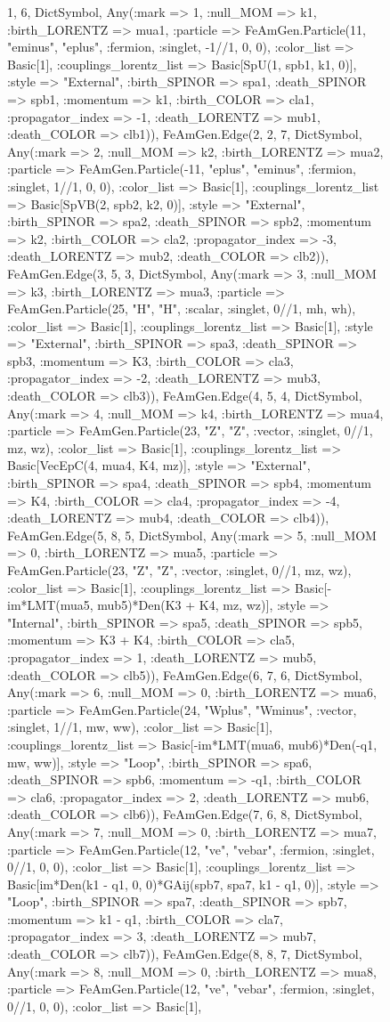 \documentclass{revtex4}
\begin{document}
\begin{figure}[!htb]
\begin{center}
{1, 6, Dict{Symbol, Any}(:mark => 1, :null_MOM => k1, :birth_LORENTZ => mua1, :particle => FeAmGen.Particle(11, "eminus", "eplus", :fermion, :singlet, -1//1, 0, 0), :color_list => Basic[1], :couplings_lorentz_list => Basic[SpU(1, spb1, k1, 0)], :style => "External", :birth_SPINOR => spa1, :death_SPINOR => spb1, :momentum => k1, :birth_COLOR => cla1, :propagator_index => -1, :death_LORENTZ => mub1, :death_COLOR => clb1)), FeAmGen.Edge(2, 2, 7, Dict{Symbol, Any}(:mark => 2, :null_MOM => k2, :birth_LORENTZ => mua2, :particle => FeAmGen.Particle(-11, "eplus", "eminus", :fermion, :singlet, 1//1, 0, 0), :color_list => Basic[1], :couplings_lorentz_list => Basic[SpVB(2, spb2, k2, 0)], :style => "External", :birth_SPINOR => spa2, :death_SPINOR => spb2, :momentum => k2, :birth_COLOR => cla2, :propagator_index => -3, :death_LORENTZ => mub2, :death_COLOR => clb2)), FeAmGen.Edge(3, 5, 3, Dict{Symbol, Any}(:mark => 3, :null_MOM => k3, :birth_LORENTZ => mua3, :particle => FeAmGen.Particle(25, "H", "H", :scalar, :singlet, 0//1, mh, wh), :color_list => Basic[1], :couplings_lorentz_list => Basic[1], :style => "External", :birth_SPINOR => spa3, :death_SPINOR => spb3, :momentum => K3, :birth_COLOR => cla3, :propagator_index => -2, :death_LORENTZ => mub3, :death_COLOR => clb3)), FeAmGen.Edge(4, 5, 4, Dict{Symbol, Any}(:mark => 4, :null_MOM => k4, :birth_LORENTZ => mua4, :particle => FeAmGen.Particle(23, "Z", "Z", :vector, :singlet, 0//1, mz, wz), :color_list => Basic[1], :couplings_lorentz_list => Basic[VecEpC(4, mua4, K4, mz)], :style => "External", :birth_SPINOR => spa4, :death_SPINOR => spb4, :momentum => K4, :birth_COLOR => cla4, :propagator_index => -4, :death_LORENTZ => mub4, :death_COLOR => clb4)), FeAmGen.Edge(5, 8, 5, Dict{Symbol, Any}(:mark => 5, :null_MOM => 0, :birth_LORENTZ => mua5, :particle => FeAmGen.Particle(23, "Z", "Z", :vector, :singlet, 0//1, mz, wz), :color_list => Basic[1], :couplings_lorentz_list => Basic[-im*LMT(mua5, mub5)*Den(K3 + K4, mz, wz)], :style => "Internal", :birth_SPINOR => spa5, :death_SPINOR => spb5, :momentum => K3 + K4, :birth_COLOR => cla5, :propagator_index => 1, :death_LORENTZ => mub5, :death_COLOR => clb5)), FeAmGen.Edge(6, 7, 6, Dict{Symbol, Any}(:mark => 6, :null_MOM => 0, :birth_LORENTZ => mua6, :particle => FeAmGen.Particle(24, "Wplus", "Wminus", :vector, :singlet, 1//1, mw, ww), :color_list => Basic[1], :couplings_lorentz_list => Basic[-im*LMT(mua6, mub6)*Den(-q1, mw, ww)], :style => "Loop", :birth_SPINOR => spa6, :death_SPINOR => spb6, :momentum => -q1, :birth_COLOR => cla6, :propagator_index => 2, :death_LORENTZ => mub6, :death_COLOR => clb6)), FeAmGen.Edge(7, 6, 8, Dict{Symbol, Any}(:mark => 7, :null_MOM => 0, :birth_LORENTZ => mua7, :particle => FeAmGen.Particle(12, "ve", "vebar", :fermion, :singlet, 0//1, 0, 0), :color_list => Basic[1], :couplings_lorentz_list => Basic[im*Den(k1 - q1, 0, 0)*GAij(spb7, spa7, k1 - q1, 0)], :style => "Loop", :birth_SPINOR => spa7, :death_SPINOR => spb7, :momentum => k1 - q1, :birth_COLOR => cla7, :propagator_index => 3, :death_LORENTZ => mub7, :death_COLOR => clb7)), FeAmGen.Edge(8, 8, 7, Dict{Symbol, Any}(:mark => 8, :null_MOM => 0, :birth_LORENTZ => mua8, :particle => FeAmGen.Particle(12, "ve", "vebar", :fermion, :singlet, 0//1, 0, 0), :color_list => Basic[1], }
\end{center}
\end{figure}
\end{document}
